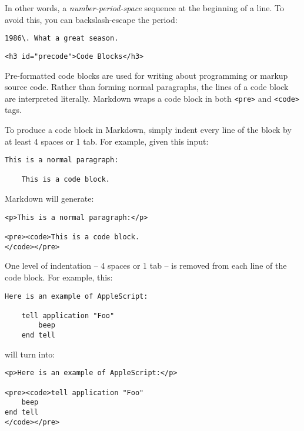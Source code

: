 In other words, a \emph{number-period-space} sequence at the beginning of a
line. To avoid this, you can backslash-escape the period:

\begin{lstlisting}
1986\. What a great season.
\end{lstlisting}


\begin{lstlisting}<h3 id="precode">Code Blocks</h3>\end{lstlisting}




Pre-formatted code blocks are used for writing about programming or
markup source code. Rather than forming normal paragraphs, the lines
of a code block are interpreted literally. Markdown wraps a code block
in both \texttt{<pre>} and \texttt{<code>} tags.



To produce a code block in Markdown, simply indent every line of the
block by at least 4 spaces or 1 tab. For example, given this input:

\begin{lstlisting}
This is a normal paragraph:

    This is a code block.
\end{lstlisting}




Markdown will generate:

\begin{lstlisting}
<p>This is a normal paragraph:</p>

<pre><code>This is a code block.
</code></pre>
\end{lstlisting}




One level of indentation -- 4 spaces or 1 tab -- is removed from each
line of the code block. For example, this:

\begin{lstlisting}
Here is an example of AppleScript:

    tell application "Foo"
        beep
    end tell
\end{lstlisting}




will turn into:

\begin{lstlisting}
<p>Here is an example of AppleScript:</p>

<pre><code>tell application "Foo"
    beep
end tell
</code></pre>
\end{lstlisting}




